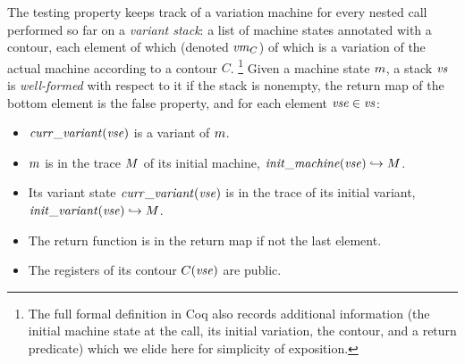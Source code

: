 \documentclass[acmsmall,review,anonymous]{acmart}\settopmatter{printfolios=true,printccs=false,printacmref=false}
\begin{document}
 The testing property keeps track of a variation machine
for every nested call performed so far on a {\em variant stack}: a
list of machine states annotated with a contour, each element of which
(denoted $\mathit{vm}_{C}$) of which is a variation of the actual machine
according to a contour $C$.
%
\footnote{The full formal definition in Coq also records additional
  information (the initial machine state at the call, its initial
  variation, the contour, and a return predicate) which we elide
  here for simplicity of exposition.}
\iflater
{}
  Given a machine state $m$, a stack $\mathit{vs}$ is \emph{well-formed} with
  respect to it if the stack is nonempty, the return map of the bottom element
  is the false property, and for each element $\mathit{vse} \in \mathit{vs}$:
  \begin{itemize}
  \item $\mathit{curr\_variant}(\mathit{vse})$ is a variant of $m$.
  \item $m$ is in the trace $M$ of its initial machine,
    $\mathit{init\_machine}(\mathit{vse}) \hookrightarrow M$.
  \item Its variant state $\mathit{curr\_variant}(\mathit{vse})$
    is in the trace of its initial variant,
    $\mathit{init\_variant}(\mathit{vse}) \hookrightarrow M$.
  \item The return function is in the return map if not the last element. 
  \item The registers of its contour $C(\mathit{vse})$ are public.
  \end{itemize}
  \fi


\end{document}
